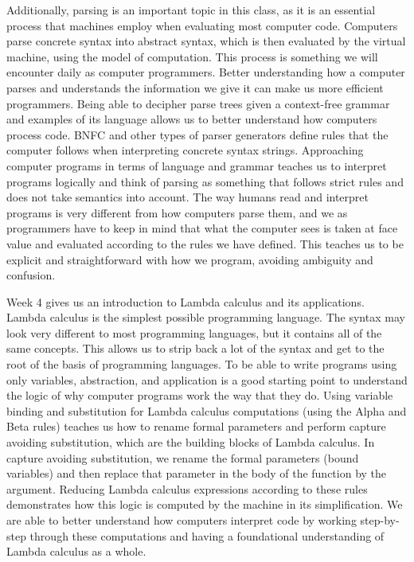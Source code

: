 \documentclass{article}
\theoremstyle{theorem}
\theoremstyle{definition}
\theoremstyle{remark}
\begin{document}
Additionally, parsing is an important topic in this class, as it is an essential process that machines employ when evaluating most computer code. Computers parse concrete syntax into abstract syntax, which is then evaluated by the virtual machine, using the model of computation. This process is something we will encounter daily as computer programmers. Better understanding how a computer parses and understands the information we give it can make us more efficient programmers. Being able to decipher parse trees given a context-free grammar and examples of its language allows us to better understand how computers process code. BNFC and other types of parser generators define rules that the computer follows when interpreting concrete syntax strings. Approaching computer programs in terms of language and grammar teaches us to interpret programs logically and think of parsing as something that follows strict rules and does not take semantics into account. The way humans read and interpret programs is very different from how computers parse them, and we as programmers have to keep in mind that what the computer sees is taken at face value and evaluated according to the rules we have defined. This teaches us to be explicit and straightforward with how we program, avoiding ambiguity and confusion.

Week 4 gives us an introduction to Lambda calculus and its applications. Lambda calculus is the simplest possible programming language. The syntax may look very different to most programming languages, but it contains all of the same concepts. This allows us to strip back a lot of the syntax and get to the root of the basis of programming languages. To be able to write programs using only variables, abstraction, and application is a good starting point to understand the logic of why computer programs work the way that they do. Using variable binding and substitution for Lambda calculus computations (using the Alpha and Beta rules) teaches us how to rename formal parameters and perform capture avoiding substitution, which are the building blocks of Lambda calculus. In capture avoiding substitution, we rename the formal parameters (bound variables) and then replace that parameter in the body of the function by the argument. Reducing Lambda calculus expressions according to these rules demonstrates how this logic is computed by the machine in its simplification. We are able to better understand how computers interpret code by working step-by-step through these computations and having a foundational understanding of Lambda calculus as a whole. 
\end{document}
